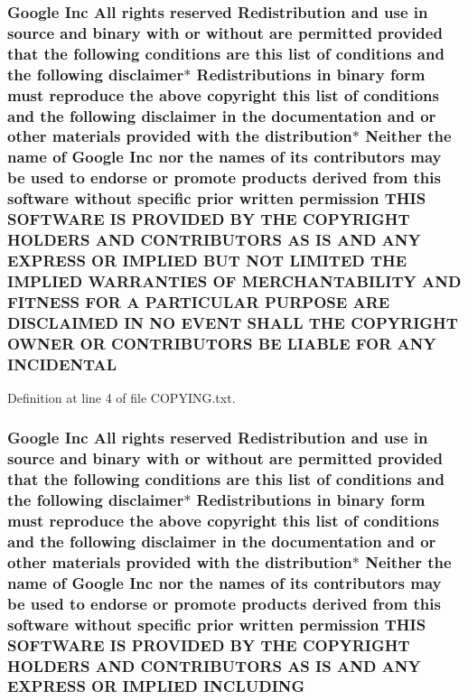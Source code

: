 \subsubsection[{\texorpdfstring{I\+N\+C\+I\+D\+E\+N\+T\+AL}{INCIDENTAL}}]{\setlength{\rightskip}{0pt plus 5cm}Google Inc All rights reserved Redistribution and use in source and binary with or without are permitted provided that the following conditions are this {\bf list} of conditions and the following disclaimer$\ast$ Redistributions in binary form must reproduce the above copyright this {\bf list} of conditions and the following disclaimer in the documentation and or other materials provided with the distribution$\ast$ Neither the name of Google Inc nor the names of its contributors may be used to endorse or promote products derived from this software without specific prior written permission T\+H\+IS S\+O\+F\+T\+W\+A\+RE IS P\+R\+O\+V\+I\+D\+ED BY T\+HE C\+O\+P\+Y\+R\+I\+G\+HT H\+O\+L\+D\+E\+RS A\+ND C\+O\+N\+T\+R\+I\+B\+U\+T\+O\+RS AS IS A\+ND A\+NY E\+X\+P\+R\+E\+SS OR I\+M\+P\+L\+I\+ED B\+UT N\+OT L\+I\+M\+I\+T\+ED T\+HE I\+M\+P\+L\+I\+ED {\bf W\+A\+R\+R\+A\+N\+T\+I\+ES} OF M\+E\+R\+C\+H\+A\+N\+T\+A\+B\+I\+L\+I\+TY A\+ND F\+I\+T\+N\+E\+SS F\+OR A P\+A\+R\+T\+I\+C\+U\+L\+AR P\+U\+R\+P\+O\+SE A\+RE D\+I\+S\+C\+L\+A\+I\+M\+ED IN NO E\+V\+E\+NT S\+H\+A\+LL T\+HE C\+O\+P\+Y\+R\+I\+G\+HT O\+W\+N\+ER OR C\+O\+N\+T\+R\+I\+B\+U\+T\+O\+RS BE L\+I\+A\+B\+LE F\+OR A\+NY I\+N\+C\+I\+D\+E\+N\+T\+AL}\hypertarget{COPYING_8txt_a89d50cb807b3f834d9fd0c8f3e983659}{}\label{COPYING_8txt_a89d50cb807b3f834d9fd0c8f3e983659}


Definition at line 4 of file C\+O\+P\+Y\+I\+N\+G.\+txt.

\subsubsection[{\texorpdfstring{I\+N\+C\+L\+U\+D\+I\+NG}{INCLUDING}}]{\setlength{\rightskip}{0pt plus 5cm}Google Inc All rights reserved Redistribution and use in source and binary with or without are permitted provided that the following conditions are this {\bf list} of conditions and the following disclaimer$\ast$ Redistributions in binary form must reproduce the above copyright this {\bf list} of conditions and the following disclaimer in the documentation and or other materials provided with the distribution$\ast$ Neither the name of Google Inc nor the names of its contributors may be used to endorse or promote products derived from this software without specific prior written permission T\+H\+IS S\+O\+F\+T\+W\+A\+RE IS P\+R\+O\+V\+I\+D\+ED BY T\+HE C\+O\+P\+Y\+R\+I\+G\+HT H\+O\+L\+D\+E\+RS A\+ND C\+O\+N\+T\+R\+I\+B\+U\+T\+O\+RS AS IS A\+ND A\+NY E\+X\+P\+R\+E\+SS OR I\+M\+P\+L\+I\+ED I\+N\+C\+L\+U\+D\+I\+NG}\hypertarget{COPYING_8txt_ab1928ef22d7c2011aca3b1e59ca80596}{}\label{COPYING_8txt_ab1928ef22d7c2011aca3b1e59ca80596}


